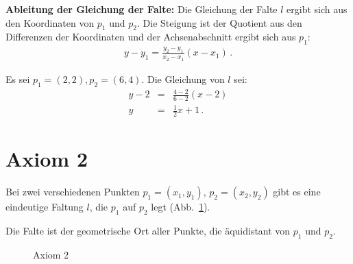 \textbf{Ableitung der Gleichung der Falte:}
Die Gleichung der Falte $l$ ergibt sich aus den Koordinaten von $p_1$ und $p_2$. Die Steigung ist der Quotient aus den Differenzen der Koordinaten und der Achsenabschnitt ergibt sich aus $p_1$:
\begin{align}
y - y_1 = \frac{y_2-y_1}{x_2-x_1}(x-x_1)\,.
\end{align}

\begin{example}
Es sei $p_1=(2,2), p_2=(6,4)$. Die Gleichung von $l$ sei:
\begin{eqnarray*}
y-2&=&\frac{4-2}{6-2}(x-2)\\
y&=&\frac{1}{2}x+1\,.
\end{eqnarray*}
\end{example}



\section{Axiom 2}\label{s.ax2}



\begin{axiom}
Bei zwei verschiedenen Punkten $p_1=(x_1,y_1)$, $p_2=(x_2,y_2)$ gibt es eine eindeutige Faltung $l$, die $p_1$ auf $p_2$ legt (Abb.~\ref{f.origami-axiom2}).
\end{axiom}

Die Falte ist der geometrische Ort aller Punkte, die äquidistant von $p_1$ und $p_2$.

\begin{figure}[ht]
\begin{center}
\end{center}
\caption{Axiom $2$}\label{f.origami-axiom2}
\end{figure}

